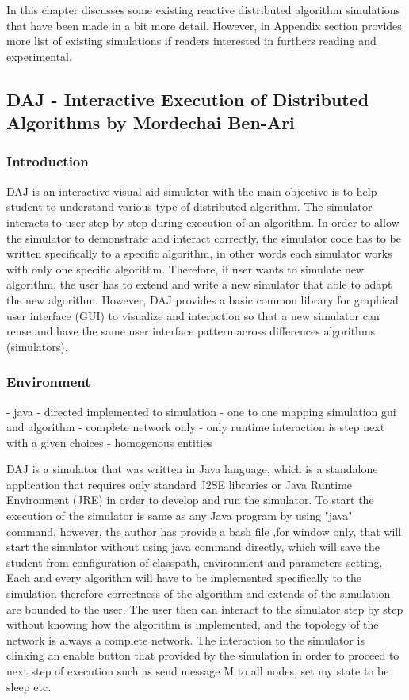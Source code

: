 
In this chapter discusses some existing reactive distributed algorithm simulations that have been made in a bit more detail. However, in Appendix section provides more list of existing simulations if readers interested in furthers reading and experimental.


\subsection{DAJ - Interactive Execution of Distributed Algorithms by Mordechai Ben-Ari}


\subsubsection{Introduction}
DAJ is an interactive visual aid simulator with the main objective is to help student to understand various type of distributed algorithm. The simulator interacts to user step by step during execution of an algorithm. In order to allow the simulator to demonstrate and interact correctly, the simulator code has to be written specifically to a specific algorithm, in other words each simulator works with only one specific algorithm. Therefore, if user wants to simulate new algorithm, the user has to extend and write a new simulator that able to adapt the new algorithm. However, DAJ provides a basic common library for graphical user interface (GUI) to visualize and interaction so that a new simulator can reuse and have the same user interface pattern across differences algorithms (simulators).

\subsubsection{Environment}
- java
- directed implemented to simulation
- one to one mapping simulation gui and algorithm
- complete network only
- only runtime interaction is step next with a given choices
- homogenous entities


DAJ is a simulator that was written in Java language, which is a standalone application that requires only standard J2SE libraries or Java Runtime Environment (JRE) in order to develop and run the simulator. To start the execution of the simulator is same as any Java program by using "java" command, however, the author has provide a bash file ,for window only, that will start the simulator without using java command directly, which will save the student from configuration of classpath, environment and parameters setting. Each and every algorithm will have to be implemented specifically to the simulation therefore correctness of the algorithm and extends of the simulation are bounded to the user. The user then can interact to the simulator step by step without knowing how the algorithm is implemented, and the topology of the network is always a complete network. The interaction to the simulator is clinking an enable button that provided by the simulation in order to proceed to next step of execution such as send message M to all nodes, set my state to be sleep etc.

